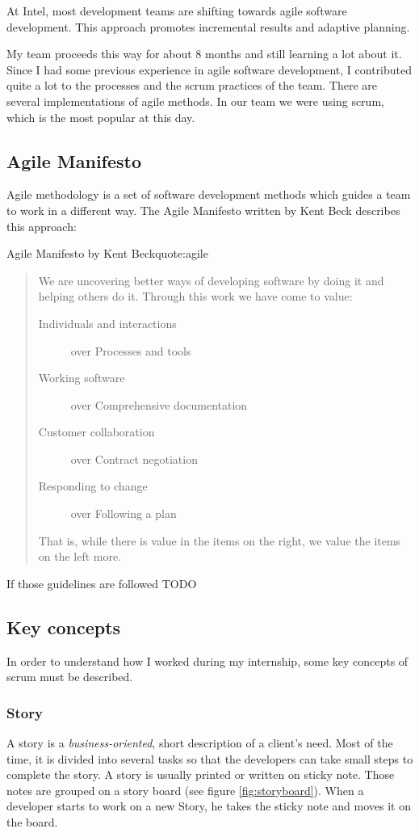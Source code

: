 At Intel, most development teams are shifting towards agile software development.
This approach promotes incremental results and adaptive planning.

My team proceeds this way for about 8 months and still learning a lot about it.
Since I had some previous experience in agile software development, I contributed quite a lot
to the processes and the \gls{scrum} practices of the team.
There are several implementations of agile methods. In our team we were using \gls{scrum}, which is the most popular at this day.

\subsection{Agile Manifesto}
Agile methodology is a set of software development methods which guides a team to work in a different way.
The Agile Manifesto written by Kent Beck describes this approach:

\begin{figureGraphics}{Agile Manifesto by Kent Beck}{quote:agile}
\begin{quotation}
    We are uncovering better ways of developing software by doing it and helping others do it. Through this work we have come to value:
    \begin{description}
        \item[Individuals and interactions] over Processes and tools
        \item[Working software] over Comprehensive documentation
        \item[Customer collaboration] over Contract negotiation
        \item[Responding to change] over Following a plan
    \end{description}
    That is, while there is value in the items on the right, we value the items on the left more.
\end{quotation}
\end{figureGraphics}

If those guidelines are followed
TODO

\subsection{Key concepts}
In order to understand how I worked during my internship, some key concepts of \gls{scrum} must be described.

\subsubsection{Story}\label{sec:story}
A story is a \emph{business-oriented}, short description of a client's need.
Most of the time, it is divided into several tasks so that the developers
can take small steps to complete the story. A story is usually printed or
written on sticky note. Those notes are grouped on a story board (see figure
\ref{fig:storyboard}). When a developer starts to work on a new Story, he takes
the sticky note and moves it on the board.

